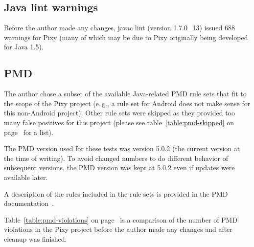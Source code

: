 \subsection{Java lint warnings}

Before the author made any changes, javac lint (version 1.7.0\_13) issued 688 warnings for Pixy (many of which may be due to Pixy originally being developed for Java 1.5).

\subsection{PMD}

The author chose a subset of the available Java-related PMD rule sets that fit to the scope of the Pixy project (e.\,g., a rule set for Android does not make sense for this non-Android project). Other rule sets were skipped as they provided too many false positives for this project (please see table~\ref{table:pmd-skipped} on page~\pageref{table:pmd-skipped} for a list).

The PMD version used for these tests was version 5.0.2 (the current version at the time of writing). To avoid changed numbers to do different behavior of subsequent versions, the PMD version was kept at 5.0.2 even if updates were available later.

A description of the rules included in the rule sets is provided in the PMD documentation~\cite{pmd-rulesets}.

Table~\ref{table:pmd-violations} on page~\pageref{table:junit-before} is a comparison of the number of PMD violations in the Pixy project before the author made any changes and after cleanup was finished.


